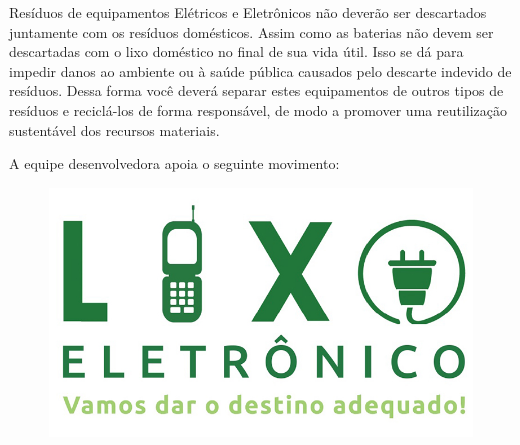 \par Resíduos de equipamentos Elétricos e Eletrônicos não deverão ser descartados juntamente com os resíduos domésticos. Assim como as baterias não devem ser descartadas com o lixo doméstico no final de sua vida útil. Isso se dá para impedir danos ao ambiente ou à saúde pública causados pelo descarte indevido de resíduos. Dessa forma você deverá separar estes equipamentos de outros tipos de resíduos e reciclá-los de forma responsável, de modo a promover uma reutilização sustentável dos recursos materiais.
\begin{center}
A equipe desenvolvedora apoia o seguinte movimento:
     \begin{figure}[H]
    \centering
		\includegraphics[scale=0.5]{Figuras/lixo_eletronico.jpg}
    \end{figure} 
\end{center}
